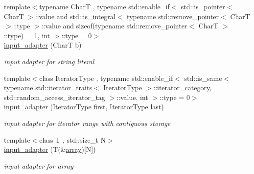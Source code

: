 \begin{DoxyCompactItemize}
\mbox{\label{classnlohmann_1_1detail_1_1input__adapter_a86f035d9c4319360014b922b5e433ced}} 
{\footnotesize template$<$typename CharT , typename std\+::enable\+\_\+if$<$ std\+::is\+\_\+pointer$<$ Char\+T $>$\+::value and std\+::is\+\_\+integral$<$ typename std\+::remove\+\_\+pointer$<$ Char\+T $>$\+::type $>$\+::value and sizeof(typename std\+::remove\+\_\+pointer$<$ Char\+T $>$\+::type)==1, int $>$\+::type  = 0$>$ }\\\mbox{\hyperlink{classnlohmann_1_1detail_1_1input__adapter_a86f035d9c4319360014b922b5e433ced}{input\+\_\+adapter}} (CharT b)
\begin{DoxyCompactList}\small\item\em input adapter for string literal \end{DoxyCompactList}\item 
\mbox{\label{classnlohmann_1_1detail_1_1input__adapter_ad6824b0f792691f75186c527fa31a6b4}} 
{\footnotesize template$<$class Iterator\+Type , typename std\+::enable\+\_\+if$<$ std\+::is\+\_\+same$<$ typename std\+::iterator\+\_\+traits$<$ Iterator\+Type $>$\+::iterator\+\_\+category, std\+::random\+\_\+access\+\_\+iterator\+\_\+tag $>$\+::value, int $>$\+::type  = 0$>$ }\\\mbox{\hyperlink{classnlohmann_1_1detail_1_1input__adapter_ad6824b0f792691f75186c527fa31a6b4}{input\+\_\+adapter}} (Iterator\+Type first, Iterator\+Type last)
\begin{DoxyCompactList}\small\item\em input adapter for iterator range with contiguous storage \end{DoxyCompactList}\item 
\mbox{\label{classnlohmann_1_1detail_1_1input__adapter_aa2392138bf8307df1994dc7eb22d51ce}} 
{\footnotesize template$<$class T , std\+::size\+\_\+t N$>$ }\\\mbox{\hyperlink{classnlohmann_1_1detail_1_1input__adapter_aa2392138bf8307df1994dc7eb22d51ce}{input\+\_\+adapter}} (T(\&\mbox{\hyperlink{namespacenlohmann_1_1detail_a1ed8fc6239da25abcaf681d30ace4985af1f713c9e000f5d3f280adbd124df4f5}{array}})\mbox{[}N\mbox{]})
\begin{DoxyCompactList}\small\item\em input adapter for array \end{DoxyCompactList}\item 

\end{DoxyCompactItemize}
